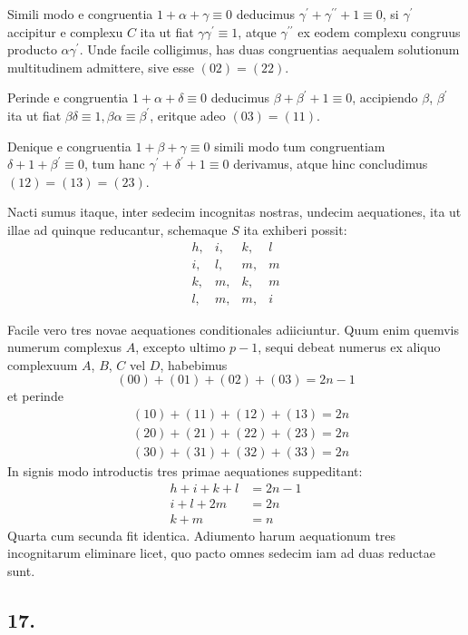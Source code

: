 \documentclass[twoside,12pt]{memoir}
\begin{document}
Simili modo e congruentia \(1+\alpha+\gamma \equiv 0\) deducimus \(\gamma^{\prime}+\gamma^{\prime \prime}+1 \equiv 0\), si \(\gamma^{\prime}\) accipitur e complexu \(C\) ita ut fiat \(\gamma \gamma^{\prime} \equiv 1\), atque \(\gamma^{\prime \prime}\) ex eodem complexu congruus producto \(\alpha \gamma^{\prime}\). Unde facile colligimus, has duas congruentias aequalem solutionum multitudinem admittere, sive esse \((02)=(22)\).
 
Perinde e congruentia \(1+\alpha+\delta \equiv 0\) deducimus \(\beta+\beta^{\prime}+1 \equiv 0\), accipiendo \(\beta\), \(\beta^{\prime}\) ita ut fiat \(\beta \delta \equiv 1, \beta \alpha \equiv \beta^{\prime}\), eritque adeo \((03)=(11)\).
 
Denique e congruentia \(1+\beta+\gamma \equiv 0\) simili modo tum congruentiam \(\delta+1+\beta^{\prime} \equiv 0\), tum hanc \(\gamma^{\prime}+\delta^{\prime}+1 \equiv 0\) derivamus, atque hinc concludimus \((12)=(13)=(23)\).
 
Nacti sumus itaque, inter sedecim incognitas nostras, undecim aequationes, ita ut illae ad quinque reducantur, schemaque \(S\) ita exhiberi possit:
\[\begin{array}{llll}
h, & i, & k, & l \\
i, & l, & m, & m \\
k, & m, & k, & m \\
l, & m, & m, & i
\end{array}\]

Facile vero tres novae aequationes conditionales adiiciuntur. Quum enim quemvis numerum complexus \(A\), excepto ultimo \(p-1\), sequi debeat numerus ex aliquo complexuum \(A\), \(B\), \(C\) vel \(D\), habebimus
\[(00)+(01)+(02)+(03)=2 n-1\]
et perinde
\[\begin{aligned}
& (10)+(11)+(12)+(13)=2 n \\
& (20)+(21)+(22)+(23)=2 n \\
& (30)+(31)+(32)+(33)=2 n
\end{aligned}\]
In signis modo introductis tres primae aequationes suppeditant:
\[\begin{aligned}
h+i+k+l & =2 n-1 \\
i+l+2 m & =2 n \\
k+m & =n
\end{aligned}\]\pagebreak%
Quarta cum secunda fit identica. Adiumento harum aequationum tres incognitarum eliminare licet, quo pacto omnes sedecim iam ad duas reductae sunt.

\subsection*{17.}
 
\end{document}
